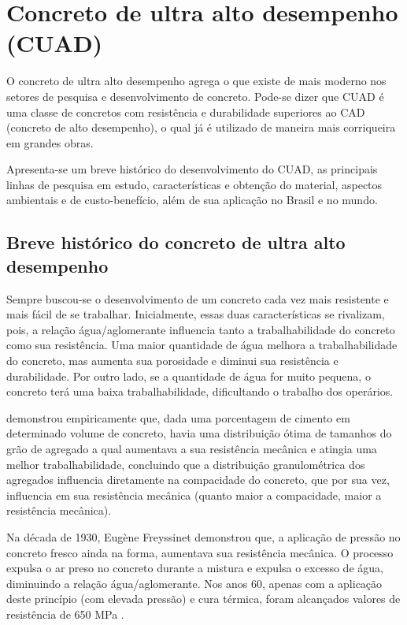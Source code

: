 \chapter{Concreto de ultra alto desempenho ({CUAD})}
\label{chap:CUAD}

O concreto de ultra alto desempenho agrega o que existe de mais moderno nos setores de pesquisa e desenvolvimento de concreto. Pode-se dizer que CUAD é uma classe de concretos com resistência e durabilidade superiores ao CAD (concreto de alto desempenho), o qual já é utilizado de maneira mais corriqueira em grandes obras.

Apresenta-se um breve histórico do desenvolvimento do CUAD, as principais linhas de pesquisa em estudo, características e obtenção do material, aspectos ambientais e de custo-benefício, além de sua aplicação no Brasil e no mundo.

\section{Breve histórico do concreto de ultra alto desempenho}

Sempre buscou-se o desenvolvimento de um concreto cada vez mais resistente e mais fácil de se trabalhar. Inicialmente, essas duas características se rivalizam, pois, a relação água/aglomerante influencia tanto a trabalhabilidade do concreto como sua resistência. Uma maior quantidade de água melhora a trabalhabilidade do concreto, mas aumenta sua porosidade e diminui sua resistência e durabilidade. Por outro lado, se a quantidade de água for muito pequena, o concreto terá uma baixa trabalhabilidade, dificultando o trabalho dos operários.


 demonstrou empiricamente que, dada uma porcentagem de cimento em determinado volume de concreto, havia uma distribuição ótima de tamanhos do grão de agregado a qual aumentava a sua resistência mecânica e atingia uma melhor trabalhabilidade, concluindo que a distribuição granulométrica dos agregados influencia diretamente na compacidade do concreto, que por sua vez, influencia em sua resistência mecânica (quanto maior a compacidade, maior a resistência mecânica).

Na década de 1930, Eugène Freyssinet demonstrou que, a aplicação de pressão no concreto fresco ainda na forma, aumentava sua resistência mecânica. O processo expulsa o ar preso no concreto durante a mistura e expulsa o excesso de água, diminuindo a relação água/aglomerante. Nos anos 60, apenas com a aplicação deste princípio (com elevada pressão) e cura térmica, foram alcançados valores de resistência de 650 MPa .

